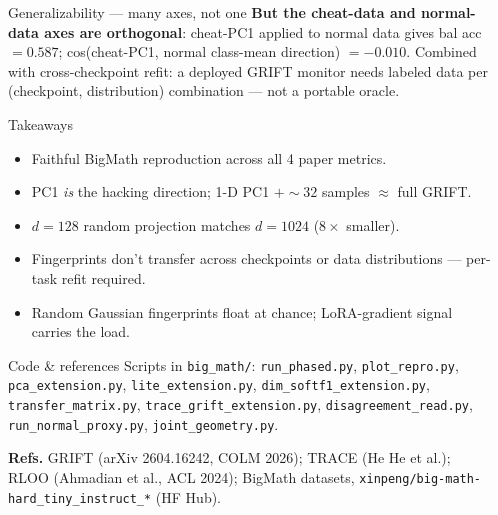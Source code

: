 \documentclass[final]{beamer}
\newlength{\sepwidth}
\newlength{\colwidth}
\newcommand{\separatorcolumn}{\begin{column}{\sepwidth}\end{column}}
\begin{document}
\begin{frame}[t]
\begin{columns}[t]
\begin{column}{\colwidth}
\begin{alertblock}{Generalizability --- many axes, not one}
    \textbf{But the cheat-data and normal-data axes are orthogonal}:
    cheat-PC1 applied to normal data gives bal acc $= 0.587$;
    cos(cheat-PC1, normal class-mean direction) $= -0.010$. Combined
    with cross-checkpoint refit: a deployed GRIFT monitor needs labeled
    data per (checkpoint, distribution) combination --- not a portable
    oracle.
  \end{alertblock}

  \begin{alertblock}{Takeaways}
    \begin{itemize}
      \item Faithful BigMath reproduction across all 4 paper metrics.
      \item PC1 \emph{is} the hacking direction; 1-D PC1 $+ \sim 32$
            samples $\approx$ full GRIFT.
      \item $d{=}128$ random projection matches $d{=}1024$
            ($8\times$ smaller).
      \item Fingerprints don't transfer across checkpoints or data
            distributions --- per-task refit required.
      \item Random Gaussian fingerprints float at chance; LoRA-gradient
            signal carries the load.
    \end{itemize}
  \end{alertblock}

  \begin{block}{Code \& references}
    \footnotesize
    Scripts in \texttt{big\_math/}: \texttt{run\_phased.py},
    \texttt{plot\_repro.py}, \texttt{pca\_extension.py},
    \texttt{lite\_extension.py}, \texttt{dim\_softf1\_extension.py},
    \texttt{transfer\_matrix.py}, \texttt{trace\_grift\_extension.py},
    \texttt{disagreement\_read.py}, \texttt{run\_normal\_proxy.py},
    \texttt{joint\_geometry.py}.

    \vspace{0.3em}
    \textbf{Refs.} GRIFT (arXiv 2604.16242, COLM 2026); TRACE
    (He He et al.); RLOO (Ahmadian et al., ACL 2024); BigMath datasets,
    \texttt{xinpeng/big-math-hard\_tiny\_instruct\_*} (HF Hub).
  \end{block}

\end{column}

\separatorcolumn
\end{columns}
\end{frame}
\end{document}
